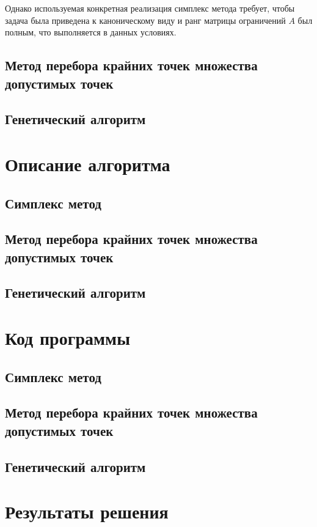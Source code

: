\documentclass[10pt,a4paper,titlepage]{article}
\begin{document}
Однако используемая конкретная реализация симплекс метода требует, 
чтобы задача была приведена к каноническому виду и 
ранг матрицы ограничений $A$ был полным, 
что выполняется в данных условиях.

\subsection{Метод перебора крайних точек множества допустимых точек}
\subsection{Генетический алгоритм}

\section{Описание алгоритма}

\subsection{Симплекс метод} %
\subsection{Метод перебора крайних точек множества допустимых точек}
\subsection{Генетический алгоритм}

\section{Код программы}

\subsection{Симплекс метод} %
\subsection{Метод перебора крайних точек множества допустимых точек}
\subsection{Генетический алгоритм}

\section{Результаты решения}
\end{document}
